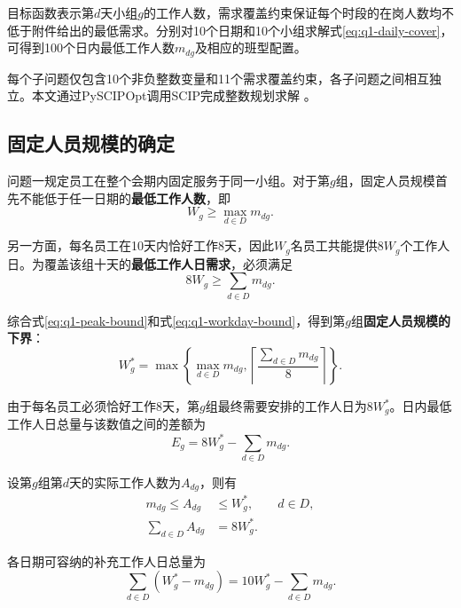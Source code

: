 \documentclass[withoutpreface,bwprint]{cumcmthesis}
\begin{document}
目标函数表示第$d$天小组$g$的工作人数，需求覆盖约束保证每个时段的在岗人数均不低于附件给出的最低需求。分别对10个日期和10个小组求解式\eqref{eq:q1-daily-cover}，可得到100个日内最低工作人数$m_{dg}$及相应的班型配置。

每个子问题仅包含10个非负整数变量和11个需求覆盖约束，各子问题之间相互独立。本文通过PySCIPOpt调用SCIP完成整数规划求解
\cite{achterberg2009scip}。

\subsection{固定人员规模的确定}

问题一规定员工在整个会期内固定服务于同一小组。对于第$g$组，固定人员规模首先不能低于任一日期的\textbf{最低工作人数}，即
\begin{equation}
W_g\geq\max_{d\in D}m_{dg}.
\label{eq:q1-peak-bound}
\end{equation}

另一方面，每名员工在10天内恰好工作8天，因此$W_g$名员工共能提供$8W_g$个工作人日。为覆盖该组十天的\textbf{最低工作人日需求}，必须满足
\begin{equation}
8W_g\geq\sum_{d\in D}m_{dg}.
\label{eq:q1-workday-bound}
\end{equation}

综合式\eqref{eq:q1-peak-bound}和式\eqref{eq:q1-workday-bound}，得到第$g$组\textbf{固定人员规模的下界}：
\begin{equation}
W_g^*
=
\max
\left\{
\max_{d\in D}m_{dg},
\left\lceil
\frac{\displaystyle\sum_{d\in D}m_{dg}}{8}
\right\rceil
\right\}.
\label{eq:q1-staff}
\end{equation}

由于每名员工必须恰好工作8天，第$g$组最终需要安排的工作人日为$8W_g^*$。日内最低工作人日总量与该数值之间的差额为
\begin{equation}
E_g
=
8W_g^*-\sum_{d\in D}m_{dg}.
\label{eq:q1-extra-workdays}
\end{equation}

设第$g$组第$d$天的实际工作人数为$A_{dg}$，则有
\begin{align}
m_{dg}\leq A_{dg}&\leq W_g^*,
&&d\in D,\label{eq:q1-actual-bound}\\
\sum_{d\in D}A_{dg}&=8W_g^*.
\label{eq:q1-actual-total}
\end{align}

各日期可容纳的补充工作人日总量为
\begin{equation}
\sum_{d\in D}\left(W_g^*-m_{dg}\right)
=
10W_g^*-\sum_{d\in D}m_{dg}.
\end{equation}
\end{document}
